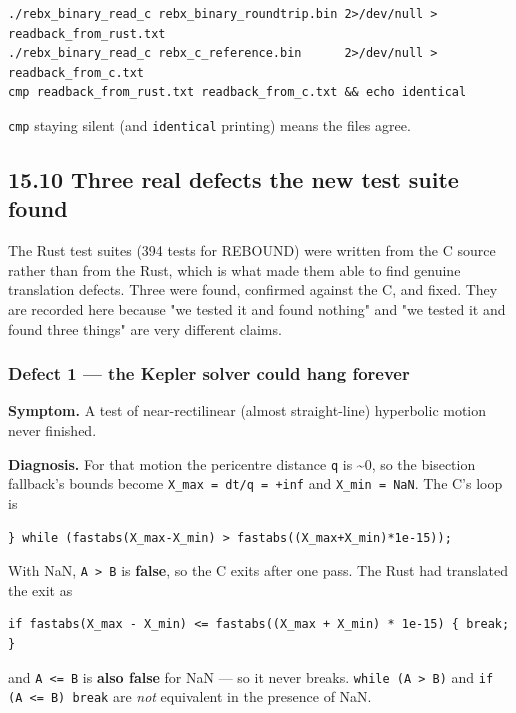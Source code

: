 \documentclass[11pt]{article}
\begin{document}
\begin{lstlisting}
./rebx_binary_read_c rebx_binary_roundtrip.bin 2>/dev/null > readback_from_rust.txt
./rebx_binary_read_c rebx_c_reference.bin      2>/dev/null > readback_from_c.txt
cmp readback_from_rust.txt readback_from_c.txt && echo identical
\end{lstlisting}

\texttt{cmp} staying silent (and \texttt{identical} printing) means the files agree.

\subsection{15.10 Three real defects the new test suite found}

The Rust test suites (394 tests for REBOUND) were written from the C source rather than from the Rust, which is what made them able to find genuine translation defects. Three were found, confirmed against the C, and fixed. They are recorded here because "we tested it and found nothing" and "we tested it and found three things" are very different claims.

\subsubsection{Defect 1 --- the Kepler solver could hang forever}

\textbf{Symptom.} A test of near-rectilinear (almost straight-line) hyperbolic motion never finished.

\textbf{Diagnosis.} For that motion the pericentre distance \texttt{q} is \textasciitilde{}0, so the bisection fallback's bounds become \texttt{X\_max = dt/q = +inf} and \texttt{X\_min = NaN}. The C's loop is

\begin{lstlisting}
} while (fastabs(X_max-X_min) > fastabs((X_max+X_min)*1e-15));
\end{lstlisting}

With NaN, \texttt{A > B} is \textbf{false}, so the C exits after one pass. The Rust had translated the exit as

\begin{lstlisting}
if fastabs(X_max - X_min) <= fastabs((X_max + X_min) * 1e-15) { break; }
\end{lstlisting}

and \texttt{A <= B} is \textbf{also false} for NaN --- so it never breaks. \texttt{while (A > B)} and \texttt{if (A <= B) break} are \emph{not} equivalent in the presence of NaN.
\end{document}
